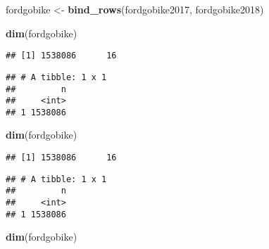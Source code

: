 \documentclass[]{article}
\newenvironment{Shaded}{\begin{snugshade}}{\end{snugshade}}
\newcommand{\DataTypeTok}[1]{\textcolor[rgb]{0.13,0.29,0.53}{#1}}
\newcommand{\DecValTok}[1]{\textcolor[rgb]{0.00,0.00,0.81}{#1}}
\newcommand{\KeywordTok}[1]{\textcolor[rgb]{0.13,0.29,0.53}{\textbf{#1}}}
\newcommand{\NormalTok}[1]{#1}
\newcommand{\OperatorTok}[1]{\textcolor[rgb]{0.81,0.36,0.00}{\textbf{#1}}}
\newcommand{\StringTok}[1]{\textcolor[rgb]{0.31,0.60,0.02}{#1}}
\begin{document}
\begin{Shaded}
\begin{Highlighting}[]
\NormalTok{fordgobike <-}\StringTok{ }\KeywordTok{bind_rows}\NormalTok{(fordgobike2017, fordgobike2018)}

\KeywordTok{dim}\NormalTok{(fordgobike)}
\end{Highlighting}
\end{Shaded}

\begin{verbatim}
## [1] 1538086      16
\end{verbatim}

\begin{Shaded}
\end{Shaded}

\begin{verbatim}
## # A tibble: 1 x 1
##         n
##     <int>
## 1 1538086
\end{verbatim}

\begin{Shaded}
\begin{Highlighting}[]
\KeywordTok{dim}\NormalTok{(fordgobike)}
\end{Highlighting}
\end{Shaded}

\begin{verbatim}
## [1] 1538086      16
\end{verbatim}

\begin{Shaded}
\end{Shaded}

\begin{verbatim}
## # A tibble: 1 x 1
##         n
##     <int>
## 1 1538086
\end{verbatim}

\begin{Shaded}
\begin{Highlighting}[]
\KeywordTok{dim}\NormalTok{(fordgobike)}
\end{Highlighting}
\end{Shaded}
\end{document}
